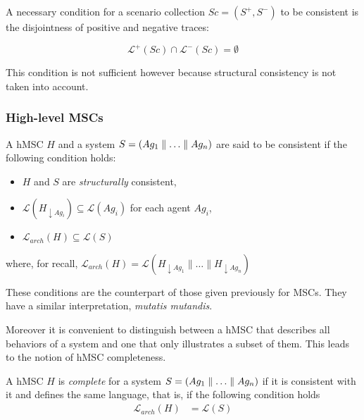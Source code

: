 A necessary condition for a scenario collection $Sc = (S^+,S^-)$ to be consistent is the disjointness of positive and negative traces:

\begin{equation}
\mathcal{L}^+(Sc) \cap \mathcal{L}^-(Sc) = \emptyset
\end{equation}

This condition is not sufficient however because structural consistency is not taken into account.

\subsubsection*{High-level MSCs}

A hMSC $H$ and a system $S = (Ag_1 \parallel \ldots \parallel Ag_n)$ are said to be consistent if the following condition holds:

\begin{itemize}
\item $H$ and $S$ are \emph{structurally} consistent,
\item $\mathcal{L}(H_{\downarrow Ag_i}) \subseteq \mathcal{L}(Ag_i)$ for each agent $Ag_i$,
\item $\mathcal{L}_{arch}(H) \subseteq \mathcal{L}(S)$
\end{itemize}

\noindent where, for recall, $\mathcal{L}_{arch}(H) = \mathcal{L}(H_{\downarrow Ag_1} \parallel \ldots \parallel H_{\downarrow Ag_n})$

These conditions are the counterpart of those given previously for MSCs. They have a similar interpretation, \emph{mutatis mutandis}. 

Moreover it is convenient to distinguish between a hMSC that describes all behaviors of a system and one that only illustrates a subset of them. This leads to the notion of hMSC completeness. 

A hMSC $H$ is \emph{complete} for a system $S = (Ag_1 \parallel \ldots \parallel Ag_n)$ if it is consistent with it and defines the same language, that is, if the following condition holds
\begin{align}
\mathcal{L}_{arch}(H) &= \mathcal{L}(S)
\end{align}

